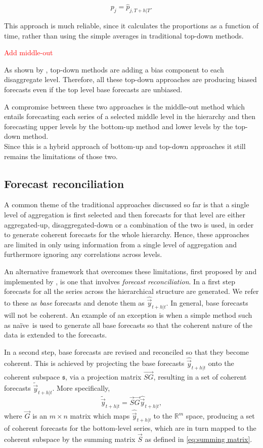 \documentclass[graybox]{svmult}
\def\naive{na\"{i}ve\ }
\begin{document}
\begin{equation}
p_j = \hat{p}_{j,T+h|T}.
\end{equation}

This approach is much reliable, since it calculates the proportions as a function of time, rather than using the simple averages in traditional top-down methods.

\textcolor{red}{Add middle-out}

As shown by \cite{HynEtAl2011}, top-down methods are adding a bias component to each disaggregate level. Therefore, all these top-down approaches are producing biased forecasts even if the top level base forecasts are unbiased.

A compromise between these two approaches is the middle-out method which entails forecasting each series of a selected middle level in the hierarchy and then forecasting upper levels by the bottom-up method and lower levels by the top-down method.\\
Since this is a hybrid approach of bottom-up and top-down approaches it still remains the limitations of those two.

\subsection{Forecast reconciliation}

A common theme of the traditional approaches discussed so far is that a single level of aggregation is first selected and then forecasts for that level are either aggregated-up, disaggregated-down or a combination of the two is used, in order to generate coherent forecasts for the whole hierarchy. Hence, these approaches are limited in only using information from a single level of aggregation and furthermore ignoring any correlations across levels.

An alternative framework that overcomes these limitations, first proposed by \citet{HynEtAl2011} and implemented by \citet{AthEtAl2009}, is one that involves \textit{forecast reconciliation}. In a first step forecasts for all the series across the hierarchical structure are generated. We refer to these as \textit{base} forecasts and denote them as $\hat{\vec{y}}_{t+h|t}$. In general, base forecasts will not be coherent. An example of an exception is when a simple method such as \naive is used to generate all base forecasts so that the coherent nature of the data is extended to the forecasts.

In a second step, base forecasts are revised and reconciled so that they become coherent. This is achieved by projecting the base forecasts $\hat{\vec{y}}_{t+h|t}$ onto the coherent subspace $\mathfrak{s}$, via a projection matrix $\vec{SG}$, resulting in a set of coherent forecasts $\tilde{\vec{y}}_{t+h|t}$. More specifically,
\begin{equation}\label{eq:recon}
\tilde{\vec{y}}_{t+h|t}=\vec{S}\vec{G}\hat{\vec{y}}_{t+h|t},
\end{equation}
where $\vec{G}$ is an $m\times n$ matrix which maps $\hat{\vec{y}}_{t+h|t}$ to the $\mathbb{R}^m$ space, producing a set of coherent forecasts for the bottom-level series, which are in turn mapped to the coherent subspace by the summing matrix $\vec{S}$ as defined in \eqref{eq:summing matrix}.
\end{document}
